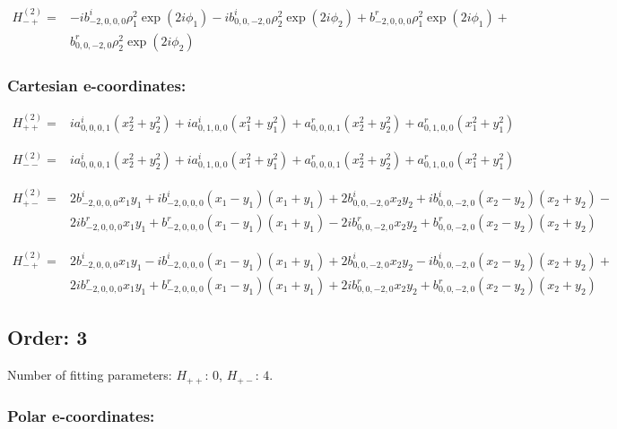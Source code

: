 \documentclass[fleqn]{article}
\begin{document}
\begin{align*}
H_{-+}^{(2)}=&- i b^{i}_{-2,0,0,0} \rho_{1}^{2} \exp (2 i \phi_{1}) - i b^{i}_{0,0,-2,0} \rho_{2}^{2} \exp (2 i \phi_{2}) + b^{r}_{-2,0,0,0} \rho_{1}^{2} \exp (2 i \phi_{1}) +\\
& b^{r}_{0,0,-2,0} \rho_{2}^{2} \exp (2 i \phi_{2})
\end{align*}
\subsubsection*{Cartesian e-coordinates:}

\begin{align*}
H_{++}^{(2)}=& i a^{i}_{0,0,0,1} (x_{2}^{2} + y_{2}^{2}) +  i a^{i}_{0,1,0,0} (x_{1}^{2} + y_{1}^{2}) + a^{r}_{0,0,0,1} (x_{2}^{2} + y_{2}^{2}) + a^{r}_{0,1,0,0} (x_{1}^{2} + y_{1}^{2})
\end{align*}

\begin{align*}
H_{--}^{(2)}=& i a^{i}_{0,0,0,1} (x_{2}^{2} + y_{2}^{2}) +  i a^{i}_{0,1,0,0} (x_{1}^{2} + y_{1}^{2}) + a^{r}_{0,0,0,1} (x_{2}^{2} + y_{2}^{2}) + a^{r}_{0,1,0,0} (x_{1}^{2} + y_{1}^{2})
\end{align*}

\begin{align*}
H_{+-}^{(2)}=&2 b^{i}_{-2,0,0,0} x_{1} y_{1} +  i b^{i}_{-2,0,0,0} (x_{1} - y_{1}) (x_{1} + y_{1}) + 2 b^{i}_{0,0,-2,0} x_{2} y_{2} +  i b^{i}_{0,0,-2,0} (x_{2} - y_{2}) (x_{2} + y_{2}) -\\
& 2 i b^{r}_{-2,0,0,0} x_{1} y_{1} + b^{r}_{-2,0,0,0} (x_{1} - y_{1}) (x_{1} + y_{1}) - 2 i b^{r}_{0,0,-2,0} x_{2} y_{2} + b^{r}_{0,0,-2,0} (x_{2} - y_{2}) (x_{2} + y_{2})
\end{align*}

\begin{align*}
H_{-+}^{(2)}=&2 b^{i}_{-2,0,0,0} x_{1} y_{1} -  i b^{i}_{-2,0,0,0} (x_{1} - y_{1}) (x_{1} + y_{1}) + 2 b^{i}_{0,0,-2,0} x_{2} y_{2} -  i b^{i}_{0,0,-2,0} (x_{2} - y_{2}) (x_{2} + y_{2}) +\\
& 2 i b^{r}_{-2,0,0,0} x_{1} y_{1} + b^{r}_{-2,0,0,0} (x_{1} - y_{1}) (x_{1} + y_{1}) + 2 i b^{r}_{0,0,-2,0} x_{2} y_{2} + b^{r}_{0,0,-2,0} (x_{2} - y_{2}) (x_{2} + y_{2})
\end{align*}
\subsection{Order: 3}
Number of fitting parameters: $H_{++}$: $0$, $H_{+-}$: $4$.
\subsubsection*{Polar e-coordinates:}
\end{document}
